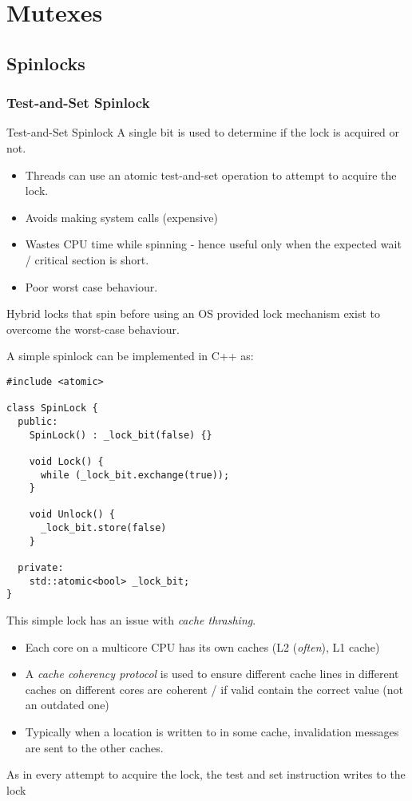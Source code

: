 \chapter{Mutexes}

\section{Spinlocks}
\subsection{Test-and-Set Spinlock}
\begin{definitionbox}{Test-and-Set Spinlock}
    A single bit is used to determine if the lock is acquired or not.
    \begin{itemize}
        \item Threads can use an atomic test-and-set operation to attempt to acquire the lock.
        \item Avoids making system calls (expensive)
        \item Wastes CPU time while spinning - hence useful only when the expected wait / critical section is short.
        \item Poor worst case behaviour.
    \end{itemize}
    Hybrid locks that spin before using an OS provided lock mechanism exist to overcome the worst-case behaviour.
\end{definitionbox}

A simple spinlock can be implemented in C++ as:
\begin{verbatim}
#include <atomic>

class SpinLock {
  public:
    SpinLock() : _lock_bit(false) {}

    void Lock() {
      while (_lock_bit.exchange(true));
    }

    void Unlock() {
      _lock_bit.store(false)
    }
  
  private:
    std::atomic<bool> _lock_bit;
}
\end{verbatim}
This simple lock has an issue with \textit{cache thrashing}. 
\begin{itemize}
  \item Each core on a multicore CPU has its own caches (L2 (\textit{often}), L1 cache)
  \item A \textit{cache coherency protocol} is used to ensure different cache lines in different caches on different cores are coherent / if valid contain the correct value (not an outdated one)
  \item Typically when a location is written to in some cache, invalidation messages are sent to the other caches.
\end{itemize}
As in every attempt to acquire the lock, the test and set instruction writes to the lock 

